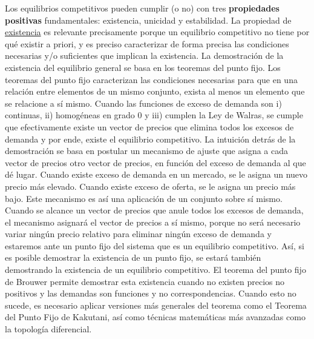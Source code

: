 \documentclass{nuevotema}
\begin{document}
Los equilibrios competitivos pueden cumplir (o no) con tres \textbf{propiedades positivas} fundamentales: existencia, unicidad y estabilidad. La propiedad de \underline{existencia} es relevante precisamente porque un equilibrio competitivo no tiene por qué existir a priori, y es preciso caracterizar de forma precisa las condiciones necesarias y/o suficientes que implican la existencia. La demostración de la existencia del equilibrio general se basa en los teoremas del punto fijo. Los teoremas del punto fijo caracterizan las condiciones necesarias para que en una relación entre elementos de un mismo conjunto, exista al menos un elemento que se relacione a sí mismo. Cuando las funciones de exceso de demanda son i) continuas, ii) homogéneas en grado 0 y iii) cumplen la Ley de Walras, se cumple que efectivamente existe un vector de precios que elimina todos los excesos de demanda y por ende, existe el equilibrio competitivo. La intuición detrás de la demostración se basa en postular un mecanismo de ajuste que asigna a cada vector de precios otro vector de precios, en función del exceso de demanda al que dé lugar. Cuando existe exceso de demanda en un mercado, se le asigna un nuevo precio más elevado. Cuando existe exceso de oferta, se le asigna un precio más bajo. Este mecanismo es así una aplicación de un conjunto sobre sí mismo. Cuando se alcance un vector de precios que anule todos los excesos de demanda, el mecanismo asignará el vector de precios a sí mismo, porque no será necesario variar ningún precio relativo para eliminar ningún exceso de demanda y estaremos ante un punto fijo del sistema que es un equilibrio competitivo. Así, si es posible demostrar la existencia de un punto fijo, se estará también demostrando la existencia de un equilibrio competitivo. El teorema del punto fijo de Brouwer permite demostrar esta existencia cuando no existen precios no positivos y las demandas son funciones y no correspondencias. Cuando esto no sucede, es necesario aplicar versiones más generales del teorema como el Teorema del Punto Fijo de Kakutani, así como técnicas matemáticas más avanzadas como la topología diferencial.
\end{document}
